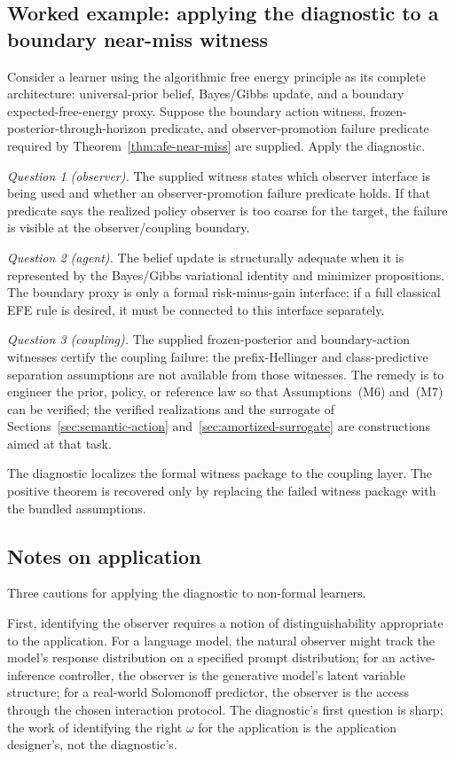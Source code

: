 \documentclass[11pt]{article}
\theoremstyle{definition}
\theoremstyle{remark}
\theoremstyle{plain}
\theoremstyle{definition}
\begin{document}
\subsection{Worked example: applying the diagnostic to a boundary near-miss witness}
\label{app:diagnostic-example}

Consider a learner using the algorithmic free energy principle as its complete architecture: universal-prior belief, Bayes/Gibbs update, and a boundary expected-free-energy proxy. Suppose the boundary action witness, frozen-posterior-through-horizon predicate, and observer-promotion failure predicate required by Theorem~\ref{thm:afe-near-miss} are supplied. Apply the diagnostic.

\emph{Question 1 (observer).} The supplied witness states which observer interface is being used and whether an observer-promotion failure predicate holds. If that predicate says the realized policy observer is too coarse for the target, the failure is visible at the observer/coupling boundary.

\emph{Question 2 (agent).} The belief update is structurally adequate when it is represented by the Bayes/Gibbs variational identity and minimizer propositions. The boundary proxy is only a formal risk-minus-gain interface; if a full classical EFE rule is desired, it must be connected to this interface separately.

\emph{Question 3 (coupling).} The supplied frozen-posterior and boundary-action witnesses certify the coupling failure: the prefix-Hellinger and class-predictive separation assumptions are not available from those witnesses. The remedy is to engineer the prior, policy, or reference law so that Assumptions~\textup{(M6)} and~\textup{(M7)} can be verified; the verified realizations and the surrogate of Sections~\ref{sec:semantic-action} and~\ref{sec:amortized-surrogate} are constructions aimed at that task.

The diagnostic localizes the formal witness package to the coupling layer. The positive theorem is recovered only by replacing the failed witness package with the bundled assumptions.

\subsection{Notes on application}
\label{app:diagnostic-notes}

Three cautions for applying the diagnostic to non-formal learners.

First, identifying the observer requires a notion of distinguishability appropriate to the application. For a language model, the natural observer might track the model's response distribution on a specified prompt distribution; for an active-inference controller, the observer is the generative model's latent variable structure; for a real-world Solomonoff predictor, the observer is the access through the chosen interaction protocol. The diagnostic's first question is sharp; the work of identifying the right $\omega$ for the application is the application designer's, not the diagnostic's.
\end{document}
